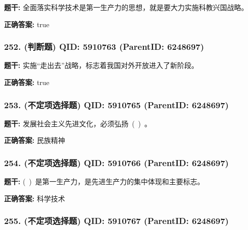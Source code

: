 \documentclass[12pt,UTF8]{ctexart}
\begin{document}
\textbf{题干:}
全面落实科学技术是第一生产力的思想，就是要大力实施科教兴国战略。



\textbf{正确答案:}
true

\vspace{0.3em}\hrulefill\vspace{0.7em}

\subsubsection*{252. (判断题) \small QID: 5910763 (ParentID: 6248697)}

\textbf{题干:}
实施“走出去”战略，标志着我国对外开放进入了新阶段。



\textbf{正确答案:}
true

\vspace{0.3em}\hrulefill\vspace{0.7em}

\subsubsection*{253. (不定项选择题) \small QID: 5910765 (ParentID: 6248697)}

\textbf{题干:}
发展社会主义先进文化，必须弘扬 ( ) 。



\textbf{正确答案:}
民族精神

\vspace{0.3em}\hrulefill\vspace{0.7em}

\subsubsection*{254. (不定项选择题) \small QID: 5910766 (ParentID: 6248697)}

\textbf{题干:}
( ) 是第一生产力，是先进生产力的集中体现和主要标志。



\textbf{正确答案:}
科学技术

\vspace{0.3em}\hrulefill\vspace{0.7em}

\subsubsection*{255. (不定项选择题) \small QID: 5910767 (ParentID: 6248697)}
\end{document}
